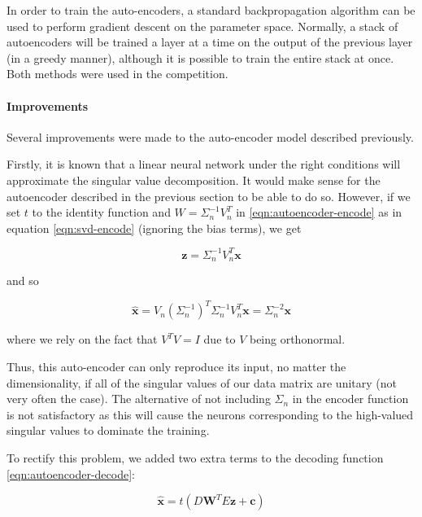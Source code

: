 \documentclass{article}
\begin{document}
In order to train the auto-encoders, a standard backpropagation algorithm can be used to perform gradient descent on the parameter space.  Normally, a stack of autoencoders will be trained a layer at a time on the output of the previous layer (in a greedy manner), although it is possible to train the entire stack at once.  Both methods were used in the competition.

\paragraph{Improvements}

Several improvements were made to the auto-encoder model described previously.

Firstly, it is known that a linear neural network under the right conditions will approximate the singular value decomposition.  It would make sense for the autoencoder described in the previous section to be able to do so.  However, if we set $t$ to the identity function and $W = \Sigma_n^{-1} V_n^T$ in \ref{eqn:autoencoder-encode} as in equation \ref{eqn:svd-encode} (ignoring the bias terms), we get

\begin{equation}
\mathbf{z} = \Sigma_n^{-1} V_n^T \mathbf{x}
\end{equation}

and so

\begin{equation}
\hat{\mathbf{x}} = V_n \left( \Sigma_n^{-1} \right)^T \Sigma_n^{-1} V_n^T \mathbf{x} = \Sigma_n^{-2} \mathbf{x}
\end{equation}

where we rely on the fact that $V^T V = I$ due to $V$ being orthonormal.

Thus, this auto-encoder can only reproduce its input, no matter the dimensionality, if all of the singular values of our data matrix are unitary (not very often the case).  The alternative of not including $\Sigma_n$ in the encoder function is not satisfactory as this will cause the neurons corresponding to the high-valued singular values to dominate the training.

To rectify this problem, we added two extra terms to the decoding function \ref{eqn:autoencoder-decode}:

\begin{equation}
\label{eqn:autoencoder-decode}
\hat{\mathbf{x}} = t(D \mathbf{W}^T E \mathbf{z} + \mathbf{c})
\end{equation}
\end{document}
